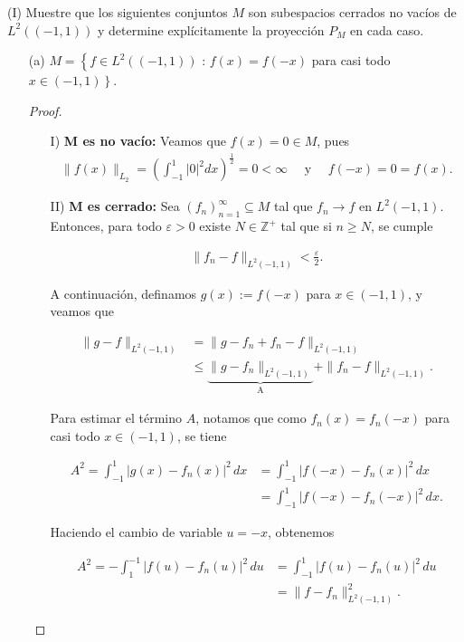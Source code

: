  (I) Muestre que los siguientes conjuntos $M$ son subespacios cerrados no vacíos de $L^2((-1,1))$ y determine explícitamente la proyección $P_M$ en cada caso.
 \begin{itemize}

     

\item[(a)] $M=\left\{f \in L^2((-1,1))\right.$ : $f(x)=f(-x)$ para casi todo $\left.x \in(-1,1)\right\}$.
\begin{proof}
\hfill
\begin{enumerate}
    \item[I)] \textbf{M es no vacío:} 
    Veamos que $f(x)=0\in M$, pues 
    \begin{align*}
        \|f(x)\|_{L_2}=\left( \int_{-1}^{1}|0|^2 dx\right)^{\frac{1}{2}}=0<\infty\quad \text{ y }\quad f(-x)=0=f(x).
    \end{align*}
    \item[II)]\textbf{M es cerrado:} Sea \( (f_n)_{n=1}^{\infty} \subseteq M \) tal que \( f_n \to f \) en \( L^2(-1,1) \). Entonces, para todo \( \varepsilon > 0 \) existe \( N \in \mathbb{Z}^+ \) tal que si \( n \geq N \), se cumple

\begin{align}
    \|f_n - f\|_{L^2(-1,1)} < \frac{\varepsilon}{2}. \label{eq:convergencia}
\end{align}

A continuación, definamos \( g(x) := f(-x) \) para \( x \in (-1,1) \), y veamos que

\begin{align}
    \|g - f\|_{L^2(-1,1)} &= \|g - f_n + f_n - f\|_{L^2(-1,1)} \nonumber \\
    &\leq \underbrace{\|g - f_n\|_{L^2(-1,1)}}_{\text{A}} + \|f_n - f\|_{L^2(-1,1)}. \label{eq:desigualdad}
\end{align}

Para estimar el término \( A \), notamos que como \( f_n(x) = f_n(-x) \) para casi todo \( x \in (-1,1) \), se tiene

\begin{align*}
    A^2 = \int_{-1}^1 |g(x) - f_n(x)|^2\,dx &= \int_{-1}^1 |f(-x) - f_n(x)|^2\,dx \\
    &= \int_{-1}^1 |f(-x) - f_n(-x)|^2\,dx.
\end{align*}

Haciendo el cambio de variable \( u = -x \), obtenemos

\begin{align}
    A^2 = -\int_{1}^{-1} |f(u) - f_n(u)|^2\,du &= \int_{-1}^{1} |f(u) - f_n(u)|^2\,du \nonumber \\
    &= \|f - f_n\|_{L^2(-1,1)}^2. \label{eq:romano}
\end{align}


\end{enumerate}
\end{proof}
\end{itemize}

